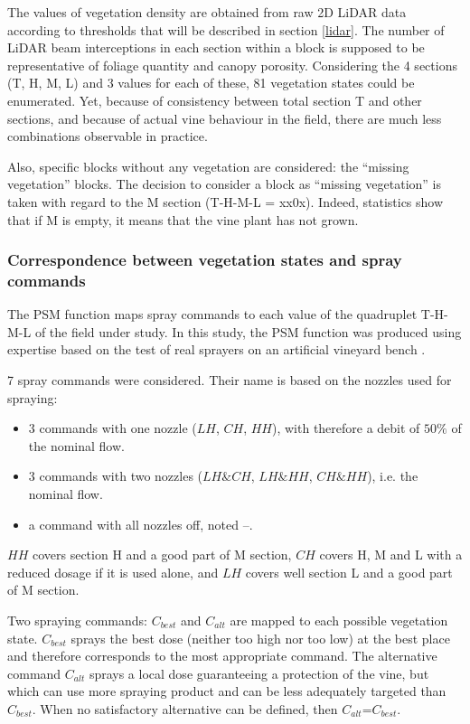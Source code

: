 \documentclass[preprint,3p,times,twocolumn]{elsarticle}
\begin{document}
The values of vegetation density are obtained from raw 2D LiDAR data according to thresholds that will be described in section \ref{lidar}. The number of LiDAR beam interceptions in each section within a block is supposed to be representative of foliage quantity and canopy porosity.
Considering the 4 sections (T, H, M, L) and 3 values for each of these, 81 vegetation states could be enumerated. Yet, because of consistency between total section T and other sections, and because of actual vine behaviour in the field, there are much less combinations observable in practice.

Also, specific blocks without any vegetation are considered: the “missing vegetation” blocks. The decision to consider a block as “missing vegetation” is taken with regard to the M section (T-H-M-L = xx0x). Indeed, statistics show that if M is empty, it means that the vine plant has not grown. 
\subsubsection{Correspondence between vegetation states and spray commands}

The PSM function maps spray commands to each value of the quadruplet T-H-M-L of the field under study. In this study, the PSM function was produced using expertise based on the test of real sprayers on an artificial vineyard bench \cite{naud2014comparative}.

7 spray commands were considered. Their name is based on the nozzles used for spraying:
\begin{itemize}
\item 3 commands with one nozzle ($LH$, $CH$, $HH$), with therefore a debit of $ 50 \% $ of the nominal flow.
\item 3 commands with two nozzles ($ LH \& CH $, $ LH \& HH $, $ CH \& HH $), i.e. the nominal flow.
\item a command with all nozzles off, noted --.
\end{itemize}

$HH$ covers section H and a good part of M section, $CH$ covers H, M and L with a reduced dosage if it is used alone, and $LH$ covers well section L and a good part of M section.

Two spraying commands: $C_{best}$ and $C_{alt}$ are mapped to each possible vegetation state. 
$C_{best}$ sprays the best dose (neither too high nor too low) at the best place and therefore corresponds to the most appropriate command. The alternative command $C_{alt}$ sprays a local dose guaranteeing a protection of the vine, but which can use more spraying product and can be less adequately targeted than $C_{best}$. When no satisfactory alternative can be defined, then $C_{alt}$=$C_{best}$. 
\end{document}
